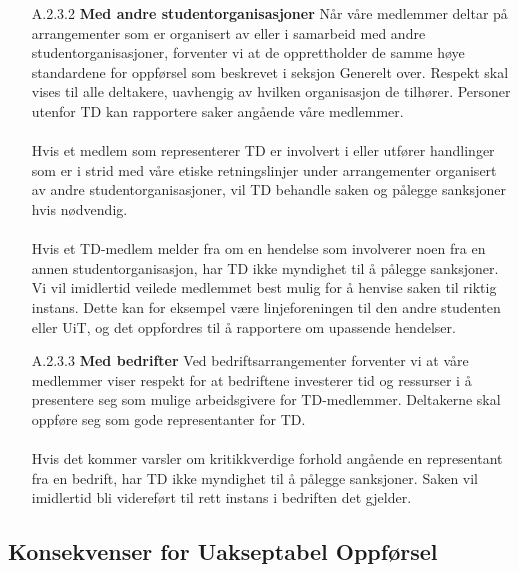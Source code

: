 \documentclass[11pt]{article}
\begin{document}
\begin{itemize}
\begin{enumerate}
         \item[A.2.3.2] \textbf{Med andre studentorganisasjoner}
         \newline
         Når våre medlemmer deltar på arrangementer som er organisert av eller i samarbeid med andre studentorganisasjoner, forventer vi at de opprettholder de samme høye standardene for oppførsel som beskrevet i seksjon Generelt over. Respekt skal vises til alle deltakere, uavhengig av hvilken organisasjon de tilhører. Personer utenfor TD kan rapportere saker angående våre medlemmer.\\\\
         Hvis et medlem som representerer TD er involvert i eller utfører handlinger som er i strid med våre etiske retningslinjer under arrangementer organisert av andre studentorganisasjoner, vil TD behandle saken og pålegge sanksjoner hvis nødvendig.\\\\
         Hvis et TD-medlem melder fra om en hendelse som involverer noen fra en annen studentorganisasjon, har TD ikke myndighet til å pålegge sanksjoner. Vi vil imidlertid veilede medlemmet best mulig for å henvise saken til riktig instans. Dette kan for eksempel være linjeforeningen til den andre studenten eller UiT, og det oppfordres til å rapportere om upassende hendelser.

         \item[A.2.3.3] \textbf{Med bedrifter} 
         \newline
         Ved bedriftsarrangementer forventer vi at våre medlemmer viser respekt for at bedriftene investerer tid og ressurser i å presentere seg som mulige arbeidsgivere for TD-medlemmer. Deltakerne skal oppføre seg som gode representanter for TD.\\\\
         Hvis det kommer varsler om kritikkverdige forhold angående en representant fra en bedrift, har TD ikke myndighet til å pålegge sanksjoner. Saken vil imidlertid bli videreført til rett instans i bedriften det gjelder.
     \end{enumerate}
 \end{itemize}
 
\subsection{Konsekvenser for Uakseptabel Oppførsel}
 
\end{document}
